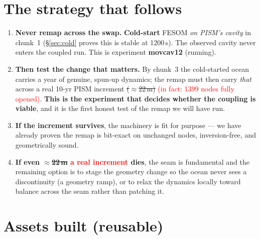 \documentclass[11pt,a4paper]{article}
\begin{document}
\section{The strategy that follows}\label{sec:strategy}

\begin{enumerate}
\item \textbf{Never remap across the swap.} \textbf{Cold-start} FESOM \emph{on PISM's cavity}
      in chunk~1 (\S\ref{sec:cold} proves this is stable at 1200\,s). The observed cavity never
      enters the coupled run. This is experiment \textbf{movcav12} (running).
\item \textbf{Then test the change that matters.} By chunk~3 the cold-started ocean carries a
      year of genuine, spun-up dynamics; the remap must then carry \emph{that} across a real
      10-yr PISM increment \sout{($\approx$22\,m)} \textcolor{red}{(in fact: 1399 nodes fully opened)}. \textbf{This is the experiment that decides whether
      the coupling is viable}, and it is the first honest test of the remap we will have run.
\item \textbf{If the increment survives}, the machinery is fit for purpose --- we have already
      proven the remap is bit-exact on unchanged nodes, inversion-free, and geometrically sound.
\item \textbf{If even \sout{$\approx$22\,m} \textcolor{red}{a real increment} dies}, the seam is fundamental and the remaining option is
      to stage the geometry change so the ocean never sees a discontinuity (a geometry ramp), or
      to relax the dynamics locally toward balance across the seam rather than patching it.
\end{enumerate}

\section{Assets built (reusable)}
\end{document}
